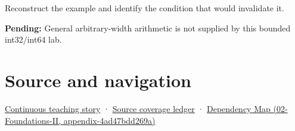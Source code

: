 Reconstruct the example and identify the condition that would invalidate it.

\textbf{Pending:} General arbitrary-width arithmetic is not supplied by this bounded int32/int64 lab.

\section{Source and navigation}\label{appendix-3333db47830f-source-and-navigation}

\href{Continuous\%20Notes/Computing\%20Foundations\%20-\%20From\%20Bits\%20to\%20C++\%20and\%20Systems\%20APIs\#Choosing\%20what\%20information\%20to\%20keep}{Continuous teaching story} · \hyperref[appendix-fd090d982a15]{Source coverage ledger} · \href{../02-Foundations-II/main.pdf\#nameddest=appendix-4ad47bdd269a}{Dependency Map (02-Foundations-II, appendix-4ad47bdd269a)}
